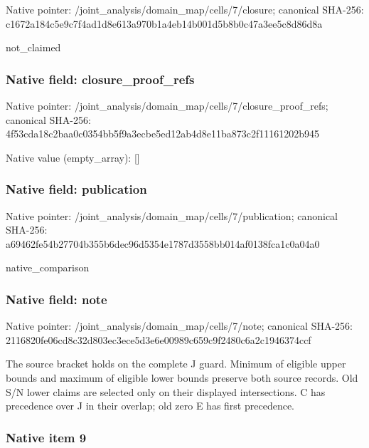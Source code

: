 \documentclass[10pt,a4paper]{article}
\begin{document}
Native pointer: /joint\_analysis/domain\_m\allowbreak{}ap/cells/7/closure; canonical SHA-256: c1672a184c5e9c7f4ad1d8e6\allowbreak{}13a970b1a4eb14b001d5b8b0\allowbreak{}c47a3ee5c8d86d8a


not\_claimed


\subsubsection{Native field: closure\_proof\_refs}


Native pointer: /joint\_analysis/domain\_m\allowbreak{}ap/cells/7/closure\_proof\allowbreak{}\_refs; canonical SHA-256: 4f53cda18c2baa0c0354bb5f\allowbreak{}9a3ecbe5ed12ab4d8e11ba87\allowbreak{}3c2f11161202b945



Native value (empty\_array): []



\subsubsection{Native field: publication}


Native pointer: /joint\_analysis/domain\_m\allowbreak{}ap/cells/7/publication; canonical SHA-256: a69462fe54b27704b355b6de\allowbreak{}c96d5354e1787d3558bb014a\allowbreak{}f0138fca1c0a04a0


native\_comparison


\subsubsection{Native field: note}


Native pointer: /joint\_analysis/domain\_map/cells/7/note; canonical SHA-256: 2116820fe06cd8c32d803ec3\allowbreak{}ece5d3e6e00989c659c9f248\allowbreak{}0c6a2c1946374ccf


The source bracket holds on the complete J guard. Minimum of eligible upper bounds and maximum of eligible lower bounds preserve both source records. Old S/N lower claims are selected only on their displayed intersections. C has precedence over J in their overlap; old zero E has first precedence.


\subsubsection{Native item 9}
\end{document}
